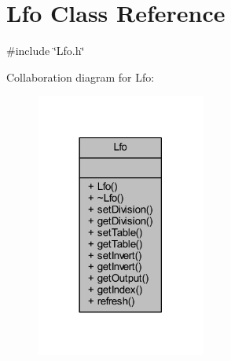 \hypertarget{class_lfo}{}\section{Lfo Class Reference}
\label{class_lfo}


{\ttfamily \#include \char`\"{}Lfo.\+h\char`\"{}}



Collaboration diagram for Lfo\+:
\nopagebreak
\begin{figure}[H]
\begin{center}
\leavevmode
\includegraphics[width=158pt]{d8/d93/class_lfo__coll__graph}
\end{center}
\end{figure}
